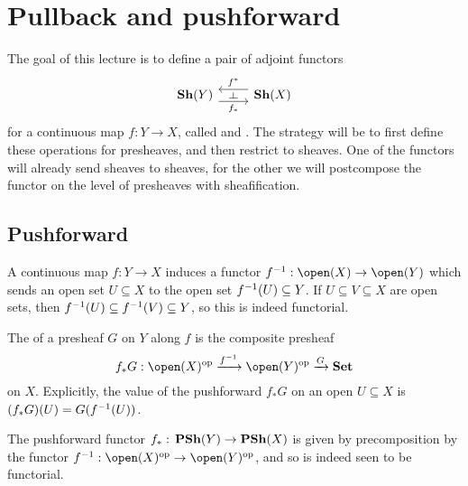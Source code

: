 \chapter{Pullback and pushforward}

\noindent
The goal of this lecture is to define a pair of adjoint functors
\begin{equation*}
  \begin{tikzcd}
    \catSheaf(Y) \ar[r, "f_*"'{name=rightadj}, shift right=2] &
    \catSheaf(X) \ar[l, "f^*"'{name=leftadj}, shift right=2]
    \ar[from=leftadj, to=rightadj, phantom, "\leftadj" rotate=-90]
  \end{tikzcd}
\end{equation*}
for a continuous map \(f\colon Y\to X\), called  and .
The strategy will be to first define these operations for presheaves, and then restrict to sheaves.
One of the functors will already send sheaves to sheaves, for the other we will postcompose the functor on the level of presheaves with sheafification.

\section{Pushforward}

A continuous map \(f\colon Y\to X\) induces a functor \(f\inv\colon\open(X)\to\open(Y)\) which sends an open set \(U\subseteq X\) to the open set \(f^{-1}(U)\subseteq Y\).
If \(U\subseteq V\subseteq X\) are open sets, then \(f^{-1}(U)\subseteq f^{-1}(V)\subseteq Y\), so this is indeed functorial.

\begin{defn}
The  of a presheaf \(G\) on \(Y\) along \(f\) is the composite presheaf
\begin{equation*}
  f_*G \colon \open(X)\opp \xrightarrow{f\inv} \open(Y)\opp \xrightarrow{G} \catSet
\end{equation*}
on \(X\).
Explicitly, the value of the pushforward \(f_*G\) on an open \(U\subseteq X\) is \((f_*G)(U) = G(f^{-1}(U))\).
\end{defn}

The pushforward functor \(f_*\colon\catPresheaf(Y)\to\catPresheaf(X)\) is given by precomposition by the functor \(f\inv\colon\open(X)\opp\to\open(Y)\opp\), and so is indeed seen to be functorial.

